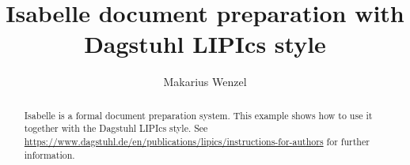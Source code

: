 \documentclass[a4paper,UKenglish,cleveref,autoref]{lipics-v2021}
\title{Isabelle document preparation with Dagstuhl LIPIcs style}
\author{Makarius Wenzel}{Augsburg, Germany \and \url{https://sketis.net}}{}{https://orcid.org/0000-0002-3753-8280}{}
\begin{document}
\maketitle

\begin{abstract}
Isabelle is a formal document preparation system. This example shows how to
use it together with the Dagstuhl LIPIcs style. See
\url{https://www.dagstuhl.de/en/publications/lipics/instructions-for-authors}
for further information.
\end{abstract}




\end{document}
